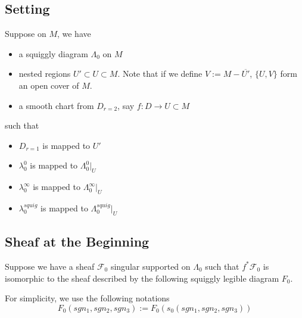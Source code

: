\subsection*{Setting}
Suppose on $M$, we have
\begin{itemize}
\item  a squiggly diagram $\Lambda_0$ on $M$

\item nested regions $U' \subset U \subset M$. Note that if we define $V:= M - \overline{U'}$, $\{U,V\}$ form an open cover of $M$.

\item a smooth chart from $D_{r=2}$, say $f: D  \rightarrow U \subset M$
\end{itemize}
such that 
\begin{itemize}
\item $D_{r=1}$ is mapped to $U'$ 

\item $\lambda_0^0$ is mapped to $\Lambda_0^0 |_{U}$

\item $\lambda_0^\infty$ is mapped to $\Lambda_0^\infty |_{U}$

\item $\lambda_0^{squig}$ is mapped to $\Lambda_0^{squig} |_{U}$
\end{itemize}

\subsection*{Sheaf at the Beginning}
Suppose we have a sheaf $\mathscr{F}_0$ singular supported on $\Lambda_0$ such that $f^*\mathscr{F}_0$ is isomorphic to the sheaf described by the following squiggly legible diagram $F_0$.

For simplicity, we use the following notations
\[
F_0(sgn_1,sgn_2,sgn_3):= F_0(s_0(sgn_1,sgn_2,sgn_3))
\]

